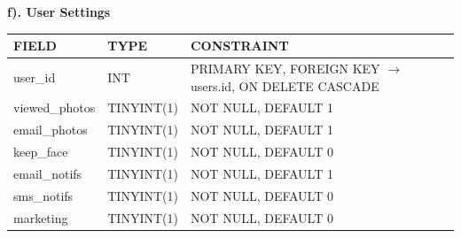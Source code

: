\vspace{0.4cm}
\noindent\textbf{f). User Settings}
\vspace{0.2cm}
\begin{center}
    \renewcommand{\arraystretch}{1.3}
    \begin{tabular}{|>{\raggedright\arraybackslash}p{3.0cm}|>{\raggedright\arraybackslash}p{4.5cm}|>{\raggedright\arraybackslash}p{8.5cm}|}
        \hline
        \rowcolor{lightgray!50}
        \textbf{FIELD} & \textbf{TYPE} & \textbf{CONSTRAINT}                                                \\ \hline
        user\_id       & INT           & PRIMARY KEY, FOREIGN KEY $\rightarrow$ users.id, ON DELETE CASCADE \\ \hline
        viewed\_photos & TINYINT(1)    & NOT NULL, DEFAULT 1                                                \\ \hline
        email\_photos  & TINYINT(1)    & NOT NULL, DEFAULT 1                                                \\ \hline
        keep\_face     & TINYINT(1)    & NOT NULL, DEFAULT 0                                                \\ \hline
        email\_notifs  & TINYINT(1)    & NOT NULL, DEFAULT 1                                                \\ \hline
        sms\_notifs    & TINYINT(1)    & NOT NULL, DEFAULT 0                                                \\ \hline
        marketing      & TINYINT(1)    & NOT NULL, DEFAULT 0                                                \\ \hline
    \end{tabular}
\end{center}

